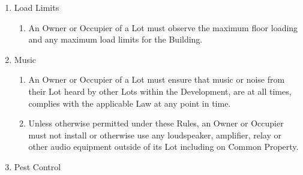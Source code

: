 \documentclass{article}
\begin{document}
\begin{enumerate}[label=\arabic*.]
\begin{enumerate}[label=\arabic{enumi}.\arabic*.]
\begin{enumerate}[label=\arabic{enumi}.\arabic*.]
\begin{enumerate}[label=(\arabic*)]
\item  An Owner or Occupier of a Lot must not alter any floor covering in its Lot without first satisfying the Owners Corporation that the proposed alteration will:

\begin{enumerate}[label=(\alph*)]

\item  enable the Owner or Occupier of a Lot to comply with Rule 4.6(1) and;

\item  comply with acoustic standards applied to the Development.

\end{enumerate}

\item  An Owner or Occupier of a Lot must not install timber flooring without first obtaining the permission of the Owners Corporation.

\end{enumerate}

\item  Load Limits

\begin{enumerate}[label=(\arabic*)]

\item  An Owner or Occupier of a Lot must observe the maximum floor loading and any maximum load limits for the Building.

\end{enumerate}

\item  Music

\begin{enumerate}[label=(\arabic*)]

\item  An Owner or Occupier of a Lot must ensure that music or noise from their Lot heard by other Lots within the Development, are at all times, complies with the applicable Law at any point in time.
\newpage



\item  Unless otherwise permitted under these Rules, an Owner or Occupier must not install or otherwise use any loudspeaker, amplifier, relay or other audio equipment outside of its Lot including on Common Property.

\end{enumerate}

\item  Pest Control


\end{enumerate}
\end{enumerate}
\end{enumerate}
\end{document}
